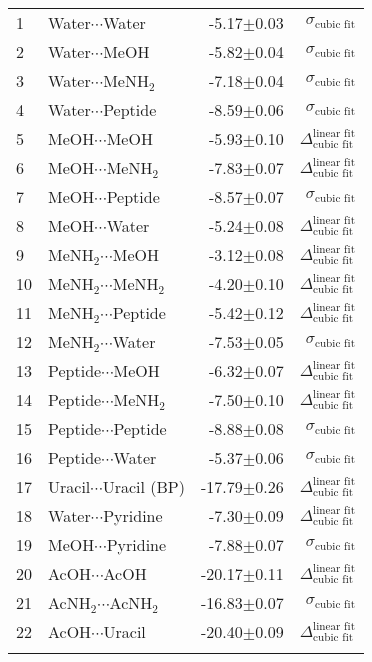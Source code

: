 \begin{longtable}{llrr}
1 & Water$\cdots$Water & -5.17$\pm$0.03 & $\sigma_\text{cubic fit}$ \\
2 & Water$\cdots$MeOH & -5.82$\pm$0.04 & $\sigma_\text{cubic fit}$ \\
3 & Water$\cdots$MeNH$_2$ & -7.18$\pm$0.04 & $\sigma_\text{cubic fit}$ \\
4 & Water$\cdots$Peptide & -8.59$\pm$0.06 & $\sigma_\text{cubic fit}$ \\
5 & MeOH$\cdots$MeOH & -5.93$\pm$0.10 & $\Delta_\text{cubic fit}^\text{linear fit}$ \\
6 & MeOH$\cdots$MeNH$_2$ & -7.83$\pm$0.07 & $\Delta_\text{cubic fit}^\text{linear fit}$ \\
7 & MeOH$\cdots$Peptide & -8.57$\pm$0.07 & $\sigma_\text{cubic fit}$ \\
8 & MeOH$\cdots$Water & -5.24$\pm$0.08 & $\Delta_\text{cubic fit}^\text{linear fit}$ \\
9 & MeNH$_2$$\cdots$MeOH & -3.12$\pm$0.08 & $\Delta_\text{cubic fit}^\text{linear fit}$ \\
10 & MeNH$_2$$\cdots$MeNH$_2$ & -4.20$\pm$0.10 & $\Delta_\text{cubic fit}^\text{linear fit}$ \\
11 & MeNH$_2$$\cdots$Peptide & -5.42$\pm$0.12 & $\Delta_\text{cubic fit}^\text{linear fit}$ \\
12 & MeNH$_2$$\cdots$Water & -7.53$\pm$0.05 & $\sigma_\text{cubic fit}$ \\
13 & Peptide$\cdots$MeOH & -6.32$\pm$0.07 & $\Delta_\text{cubic fit}^\text{linear fit}$ \\
14 & Peptide$\cdots$MeNH$_2$ & -7.50$\pm$0.10 & $\Delta_\text{cubic fit}^\text{linear fit}$ \\
15 & Peptide$\cdots$Peptide & -8.88$\pm$0.08 & $\sigma_\text{cubic fit}$ \\
16 & Peptide$\cdots$Water & -5.37$\pm$0.06 & $\sigma_\text{cubic fit}$ \\
17 & Uracil$\cdots$Uracil (BP) & -17.79$\pm$0.26 & $\Delta_\text{cubic fit}^\text{linear fit}$ \\
18 & Water$\cdots$Pyridine & -7.30$\pm$0.09 & $\Delta_\text{cubic fit}^\text{linear fit}$ \\
19 & MeOH$\cdots$Pyridine & -7.88$\pm$0.07 & $\sigma_\text{cubic fit}$ \\
20 & AcOH$\cdots$AcOH & -20.17$\pm$0.11 & $\Delta_\text{cubic fit}^\text{linear fit}$ \\
21 & AcNH$_2$$\cdots$AcNH$_2$ & -16.83$\pm$0.07 & $\sigma_\text{cubic fit}$ \\
22 & AcOH$\cdots$Uracil & -20.40$\pm$0.09 & $\Delta_\text{cubic fit}^\text{linear fit}$ \\
$$
\end{longtable}
